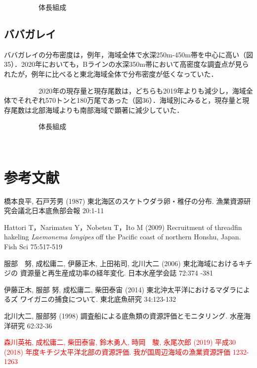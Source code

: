 \documentclass[11pt]{article} %
\begin{document}
\begin{linenumbers}
\ \ \ \ \ \ \ \ \ \ 
体長組成

\subsection{ババガレイ}
ババガレイの分布密度は，例年，海域全体で水深250m-450m帯を中心に高い（図35）．2020年においても，Bラインの水深350m帯において高密度な調査点が見られたが，例年に比べると東北海域全体で分布密度が低くなっていた．

\ \ \ \ \ \ \ \ \ \ 
2020年の現存量と現存尾数は，どちらも2019年よりも減少し，海域全体でそれぞれ570トンと180万尾であった（図36）．海域別にみると，現存量と現存尾数は北部海域よりも南部海域で顕著に減少していた．


\ \ \ \ \ \ \ \ \ \ 
体長組成


\ \ \ \ \ \ \ \ \ \ 
\section{参考文献}
\hangindent=30pt
\noindent
橋本良平, 石戸芳男 (1987) 東北海区のスケトウダラ卵・稚仔の分布. 漁業資源研究会議北日本底魚部会報 20:1-11

\hangindent=30pt
\noindent
Hattori T，Narimatsu Y，Nobetsu T，Ito M (2009) Recruitment of threadfin hakeling \textit{Laemonema longipes} off the Pacific coast of northern Honshu, Japan. Fish Sci 75:517-519

\hangindent=30pt
\noindent
服部　努, 成松庸二, 伊藤正木, 上田祐司, 北川大二 (2006) 東北海域におけるキチジの
資源量と再生産成功率の経年変化. 日本水産学会誌 72:374 -381

\hangindent=30pt
\noindent
伊藤正木, 服部 努, 成松庸二, 柴田泰宙 (2014) 東北沖太平洋におけるマダラによるズ
ワイガニの捕食について. 東北底魚研究 34:123-132

\hangindent=30pt
\noindent
北川大二, 服部努 (1998) 調査船による底魚類の資源評価とモニタリング. 水産海洋研究 62:32-36

\hangindent=30pt
\noindent
\textcolor{red}{森川英祐, 成松庸二, 柴田泰宙, 鈴木勇人, 時岡　駿, 永尾次郎 (2019) 平成30 (2018) 年度キチジ太平洋北部の資源評価. 我が国周辺海域の漁業資源評価 1232-1263}


\end{linenumbers}
\end{document}
